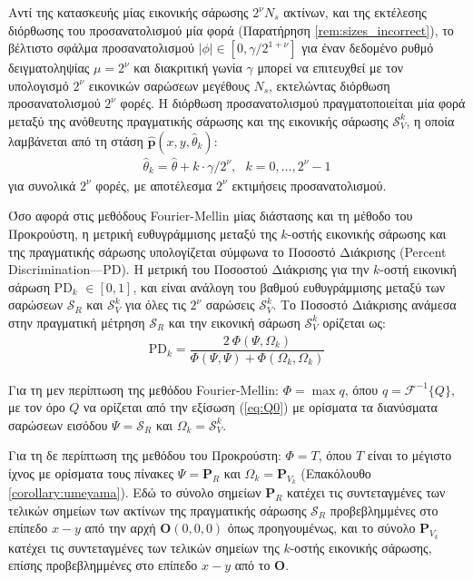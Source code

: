 Αντί της κατασκευής μίας εικονικής σάρωσης $2^\nu N_s$ ακτίνων, και της
εκτέλεσης διόρθωσης του προσανατολισμού μία φορά (Παρατήρηση
\ref{rem:sizes_incorrect}), το βέλτιστο σφάλμα προσανατολισμού $|\phi| \in
[0,\gamma / 2^{1+\nu}]$ για έναν δεδομένο ρυθμό δειγματοληψίας $\mu = 2^\nu$
και διακριτική γωνία $\gamma$ μπορεί να επιτευχθεί με τον υπολογισμό
$2^\nu$ εικονικών σαρώσεων μεγέθους $N_s$, εκτελώντας διόρθωση προσανατολισμού
$2^\nu$ φορές. Η διόρθωση προσανατολισμού πραγματοποιείται μία φορά μεταξύ της
ανόθευτης πραγματικής σάρωσης και της εικονικής σάρωσης $\mathcal{S}_V^k$, η
οποία λαμβάνεται από τη στάση $\hat{\bm{p}}(x,y,\hat{\theta}_k)$:
\begin{align}
  \hat{\theta}_k = \hat{\theta} + k \cdot \gamma / 2^\nu, \ \ \ k = 0,\dots,2^\nu-1 \label{eq:theta_k_theseus}
\end{align}
για συνολικά $2^\nu$ φορές, με αποτέλεσμα $2^\nu$ εκτιμήσεις προσανατολισμού.

Όσο αφορά στις μεθόδους Fourier-Mellin μίας διάστασης και τη μέθοδο του
Προκρούστη, η μετρική ευθυγράμμισης μεταξύ της $k$-οστής εικονικής σάρωσης και
της πραγματικής σάρωσης υπολογίζεται σύμφωνα το Ποσοστό Διάκρισης (Percent
Discrimination---PD). Η μετρική του Ποσοστού Διάκρισης για την $k$-οστή
εικονική σάρωση PD$_k$ $\in [0,1]$, και είναι ανάλογη του βαθμού ευθυγράμμισης
μεταξύ των σαρώσεων $\mathcal{S}_R$ και $\mathcal{S}_V^k$ για όλες τις $2^\nu$
σαρώσεις $\mathcal{S}_V^k$. Το Ποσοστό Διάκρισης ανάμεσα στην πραγματική
μέτρηση $\mathcal{S}_R$ και την εικονική σάρωση $\mathcal{S}_V^k$ ορίζεται ως:
\begin{align}
  \text{PD}_k = \dfrac{2 \ \Phi(\Psi,\Omega_k)}{\Phi(\Psi,\Psi) + \Phi(\Omega_k,\Omega_k)} \label{eq:pd}
\end{align}

Για τη μεν περίπτωση της μεθόδου Fourier-Mellin: $\Phi = \max q$, όπου $q =
\mathcal{F}^{-1}\{Q\}$, με τον όρο $Q$ να ορίζεται από την εξίσωση
(\ref{eq:Q0}) με ορίσματα τα διανύσματα σαρώσεων εισόδου $\Psi = \mathcal{S}_R$
και $\Omega_k = \mathcal{S}_V^k$.

Για τη δε περίπτωση της μεθόδου του Προκρούστη: $\Phi = T$, όπου $T$ είναι το
μέγιστο ίχνος με ορίσματα τους πίνακες $\Psi = \bm{P}_R$ και $\Omega_k =
\bm{P}_{V_k}$ (Επακόλουθο \ref{corollary:umeyama}). Εδώ το σύνολο σημείων
$\bm{P}_R$ κατέχει τις συντεταγμένες των τελικών σημείων των ακτίνων της
πραγματικής σάρωσης $\mathcal{S}_R$ προβεβλημμένες στο επίπεδο $x-y$ από την
αρχή $\bm{O}(0,0,0)$ όπως προηγουμένως, και το σύνολο $\bm{P}_{V_k}$ κατέχει
τις συντεταγμένες των τελικών σημείων της $k$-οστής εικονικής σάρωσης, επίσης
προβεβλημμένες στο επίπεδο $x-y$ από το $\bm{O}$.

